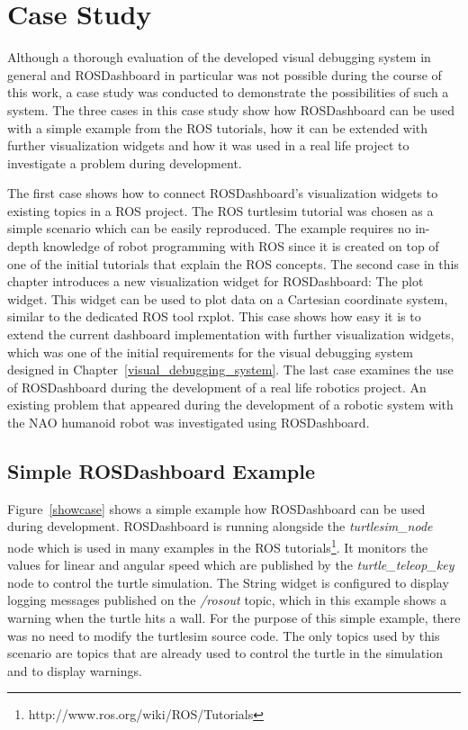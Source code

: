 \chapter{Case Study}
Although a thorough evaluation of the developed visual debugging system in general and ROSDashboard in particular was not possible during the course of this work, a case study was conducted to demonstrate the possibilities of such a system. The three cases in this case study show how ROSDashboard can be used with a simple example from the ROS tutorials, how it can be extended with further visualization widgets and how it was used in a real life project to investigate a problem during development.

The first case shows how to connect ROSDashboard's visualization widgets to existing topics in a ROS project. The ROS turtlesim tutorial was chosen as a simple scenario which can be easily reproduced. The example requires no in-depth knowledge of robot programming with ROS since it is created on top of one of the initial tutorials that explain the ROS concepts. The second case in this chapter introduces a new visualization widget for ROSDashboard: The plot widget. This widget can be used to plot data on a Cartesian coordinate system, similar to the dedicated ROS tool rxplot. This case shows how easy it is to extend the current dashboard implementation with further visualization widgets, which was one of the initial requirements for the visual debugging system designed in Chapter~\ref{visual_debugging_system}. The last case examines the use of ROSDashboard during the development of a real life robotics project. An existing problem that appeared during the development of a robotic system with the NAO humanoid robot was investigated using ROSDashboard.

\section{Simple ROSDashboard Example}
Figure~\ref{showcase} shows a simple example how ROSDashboard can be used during development. ROSDashboard is running alongside the \emph{turtlesim\_node} node which is used in many examples in the ROS tutorials\footnote{http://www.ros.org/wiki/ROS/Tutorials}. It monitors the values for linear and angular speed which are published by the \emph{turtle\_teleop\_key} node to control the turtle simulation. The String widget is configured to display logging messages published on the \emph{/rosout} topic, which in this example shows a warning when the turtle hits a wall. For the purpose of this simple example, there was no need to modify the turtlesim source code. The only topics used by this scenario are topics that are already used to control the turtle in the simulation and to display warnings.

